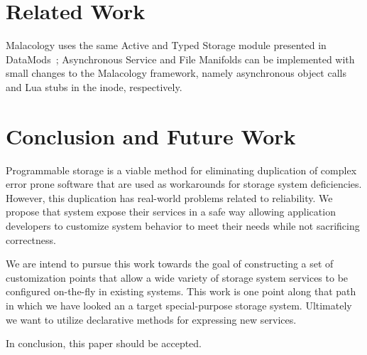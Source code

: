 \documentclass[10pt,twocolumn]{article}
\begin{document}
\section{Related Work}


Malacology uses the same Active and Typed Storage module presented in
DataMods~\cite{watkins_datamods_2012}; Asynchronous Service and File
Manifolds can be implemented with small changes to the Malacology
framework, namely asynchronous object calls and Lua stubs in the inode,
respectively.


\section{Conclusion and Future Work}\label{conclusion-and-future-work}

Programmable storage is a viable method for eliminating duplication of
complex error prone software that are used as workarounds for storage
system deficiencies. However, this duplication has real-world problems
related to reliability. We propose that system expose their services in
a safe way allowing application developers to customize system behavior
to meet their needs while not sacrificing correctness.

We are intend to pursue this work towards the goal of constructing a set
of customization points that allow a wide variety of storage system
services to be configured on-the-fly in existing systems. This work is
one point along that path in which we have looked an a target
special-purpose storage system. Ultimately we want to utilize
declarative methods for expressing new services.

In conclusion, this paper should be accepted.



\end{document}
